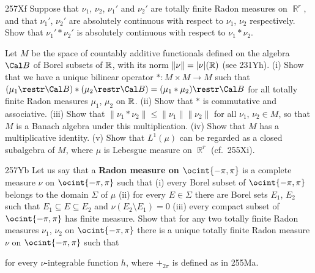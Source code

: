 {\spheader 257Xf Suppose that $\nu_1$, $\nu_2$, $\nu_1'$ and $\nu_2'$ are 
totally finite Radon measures on $\BbbR^r$, and that $\nu_1'$, $\nu_2'$ 
are absolutely continuous with respect to $\nu_1$, $\nu_2$ respectively.   Show that 
$\nu_1'*\nu_2'$ is absolutely continuous with respect to $\nu_1*\nu_2$. 
 
Let $M$ be the space of countably additive 
functionals defined on the algebra $\Cal B$ of Borel subsets of 
$\Bbb R$, with its norm $\|\nu\|=|\nu|(\Bbb R)$ (see 231Yh).   (i) Show 
that we have a unique bilinear operator $*:M\times M\to M$ such that 
$(\mu_1\restr\Cal B)*(\mu_2\restr\Cal B)=(\mu_1*\mu_2)\restr\Cal B$ for 
all totally finite Radon measures $\mu_1$, $\mu_2$ on $\Bbb R$.  (ii) 
Show that $*$ is commutative and associative.   (iii) Show that 
$\|\nu_1*\nu_2\|\le\|\nu_1\|\|\nu_2\|$ for all $\nu_1$, $\nu_2\in M$, so 
that $M$ is a Banach algebra under this multiplication.   (iv) Show that 
$M$ has a multiplicative identity.   (v) Show that $L^1(\mu)$ can be 
regarded as a closed subalgebra of $M$, where $\mu$ is Lebesgue measure 
on $\BbbR^r$ (cf.\ 255Xi). 
 
\spheader 257Yb Let us say that a {\bf Radon 
measure on $\ocint{-\pi,\pi}$} is a 
complete measure $\nu$ on $\ocint{-\pi,\pi}$ 
such that (i) every Borel subset of 
$\ocint{-\pi,\pi}$ belongs to the domain $\Sigma$
of $\mu$ (ii) for every $E\in\Sigma$ there 
are Borel sets $E_1$, $E_2$ such that $E_1\subseteq E\subseteq E_2$ 
and $\nu(E_2\setminus E_1)=0$ (iii) every compact subset 
of $\ocint{-\pi,\pi}$ has finite measure.   Show that for any two 
totally finite Radon measures $\nu_1$, $\nu_2$ on $\ocint{-\pi,\pi}$ 
there is a unique totally finite Radon measure $\nu$ on 
$\ocint{-\pi,\pi}$ such that 
 
 
\noindent for every $\nu$-integrable function $h$, where $+_{2\pi}$ is 
defined as in 255Ma. 
}%
 
 
\discrpage 
 
